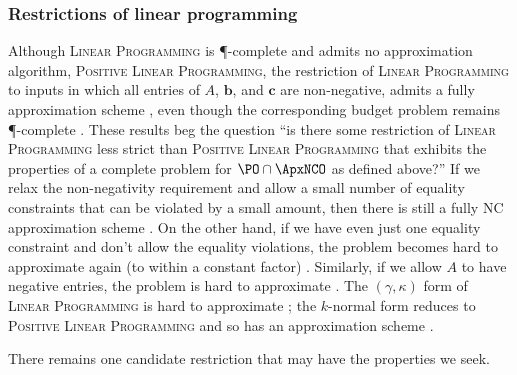 \documentclass[]{article}
\begin{document}
\subsubsection{Restrictions of linear programming}

Although \textsc{Linear Programming} is \P-complete and admits no \NC{} approximation algorithm, \textsc{Positive Linear Programming}, the restriction of \textsc{Linear Programming} to inputs in which all entries of $A$, $\mathbf{b}$, and $\mathbf{c}$ are non-negative, admits a fully \NC{} approximation scheme \cite{ln93}, even though the corresponding budget problem remains \P-complete \cite[Theorem~4]{tx98}.
These results beg the question ``is there some restriction of \textsc{Linear Programming} less strict than \textsc{Positive Linear Programming} that exhibits the properties of a complete problem for $\PO \cap \ApxNCO$ as defined above?''
If we relax the non-negativity requirement and allow a small number of equality constraints that can be violated by a small amount, then there is still a fully NC approximation scheme \cite[Theorem~5.2]{tx98}.
On the other hand, if we have even just one equality constraint and don't allow the equality violations, the problem becomes hard to approximate again (to within a constant factor) \cite[Theorem~3.1]{es99} \cite[Remark~2]{tx98}.
Similarly, if we allow $A$ to have negative entries, the problem is hard to approximate \cite[Corollary~2]{efraimidis08}.
The $(\gamma, \kappa)$ form of \textsc{Linear Programming} is hard to approximate \cite[Proposition~1]{efraimidis08}; the $k$-normal form reduces to \textsc{Positive Linear Programming} and so has an approximation scheme \cite[Theorem~2]{trevisan00}.

There remains one candidate restriction that may have the properties we seek.
\end{document}
